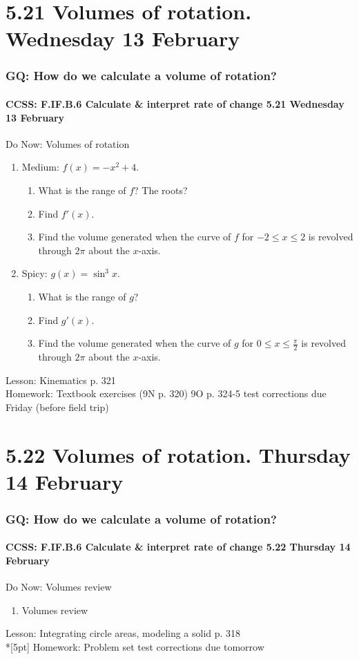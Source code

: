 \documentclass{beamer}
\begin{document}
\section{5.21 Volumes of rotation. Wednesday 13 February}
  \frame
  {
    \frametitle{GQ: How do we calculate a volume of rotation?}
    \framesubtitle{CCSS: F.IF.B.6 Calculate \& interpret rate of change \hfill \alert{5.21 Wednesday 13 February}}

    \begin{block}{Do Now: Volumes of rotation}
    \begin{enumerate}
        \item Medium: $f(x)=-x^2+4$.
        \begin{enumerate}
            \item What is the range of $f$? The roots?
            \item Find $f'(x)$.
            \item Find the volume generated when the curve of $f$ for $-2 \leq x \leq 2$ is revolved through $2\pi$ about the $x$-axis.
        \end{enumerate}
        \item Spicy: $g(x)= \sin^3x$.
        \begin{enumerate}
            \item What is the range of $g$?
            \item Find $g'(x)$.
            \item Find the volume generated when the curve of $g$ for $0 \leq x \leq \frac{\pi}{2}$ is revolved through $2\pi$ about the $x$-axis.
        \end{enumerate}
    \end{enumerate}
    \end{block}
    Lesson: Kinematics p. 321\\
    Homework: Textbook exercises (9N p. 320) 9O p. 324-5 \alert{test corrections due Friday (before field trip)}
  }


\section{5.22 Volumes of rotation. Thursday 14 February}
  \frame
  {
    \frametitle{GQ: How do we calculate a volume of rotation?}
    \framesubtitle{CCSS: F.IF.B.6 Calculate \& interpret rate of change \hfill \alert{5.22 Thursday 14 February}}

    \begin{block}{Do Now: Volumes review}
    \begin{enumerate}
        \item Volumes review
    \end{enumerate}
    \end{block}
    Lesson: Integrating circle areas, modeling a solid p. 318\\*[5pt]
    Homework: Problem set \alert{test corrections due tomorrow}
  }
\end{document}
